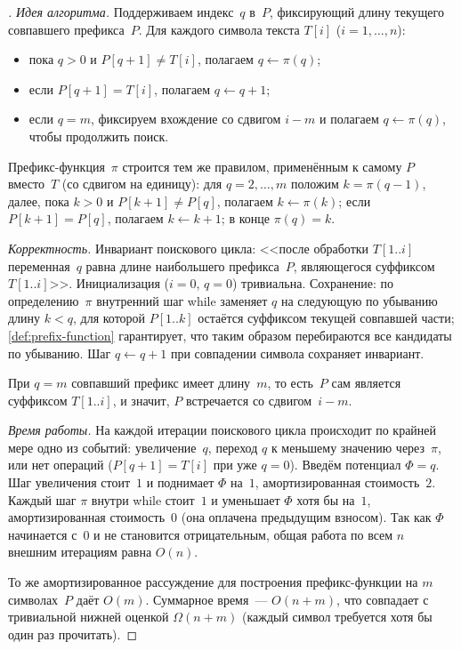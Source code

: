 \begin{proof}[]
\emph{Идея алгоритма.} Поддерживаем индекс~$q$ в~$P$, фиксирующий
длину текущего совпавшего префикса~$P$. Для каждого символа текста
$T[i]$ ($i = 1, \dots, n$):
\begin{itemize}
  \item пока $q > 0$ и $P[q + 1] \neq T[i]$, полагаем
        $q \leftarrow \pi(q)$;
  \item если $P[q + 1] = T[i]$, полагаем $q \leftarrow q + 1$;
  \item если $q = m$, фиксируем вхождение со сдвигом $i - m$ и
        полагаем $q \leftarrow \pi(q)$, чтобы продолжить поиск.
\end{itemize}
Префикс-функция~$\pi$ строится тем же правилом, применённым к самому
$P$ вместо~$T$ (со сдвигом на единицу): для $q = 2, \dots, m$ положим
$k = \pi(q - 1)$, далее, пока $k > 0$ и $P[k + 1] \neq P[q]$, полагаем
$k \leftarrow \pi(k)$; если $P[k + 1] = P[q]$, полагаем
$k \leftarrow k + 1$; в конце $\pi(q) = k$.

\emph{Корректность.} Инвариант поискового цикла: <<после обработки
$T[1..i]$ переменная~$q$ равна длине наибольшего префикса~$P$,
являющегося суффиксом $T[1..i]$>>. Инициализация ($i = 0$, $q = 0$)
тривиальна. Сохранение: по определению~$\pi$ внутренний шаг while
заменяет $q$ на следующую по убыванию длину $k < q$, для которой
$P[1..k]$ остаётся суффиксом текущей совпавшей части;
\cref{def:prefix-function} гарантирует, что таким образом
перебираются все кандидаты по убыванию. Шаг $q \leftarrow q + 1$ при
совпадении символа сохраняет инвариант.

При $q = m$ совпавший префикс имеет длину~$m$, то есть~$P$ сам
является суффиксом $T[1..i]$, и значит, $P$ встречается со
сдвигом~$i - m$.

\emph{Время работы.} На каждой итерации поискового цикла происходит
по крайней мере одно из событий: увеличение~$q$, переход $q$ к меньшему
значению через~$\pi$, или нет операций ($P[q + 1] = T[i]$ при уже
$q = 0$). Введём потенциал $\Phi = q$. Шаг увеличения стоит~$1$ и
поднимает $\Phi$ на~$1$, амортизированная стоимость~$2$. Каждый шаг
$\pi$ внутри while стоит~$1$ и уменьшает $\Phi$ хотя бы на~$1$,
амортизированная стоимость~$0$ (она оплачена предыдущим взносом). Так
как $\Phi$ начинается с~$0$ и не становится отрицательным, общая
работа по всем $n$ внешним итерациям равна $O(n)$.

То же амортизированное рассуждение для построения префикс-функции на
$m$ символах~$P$ даёт $O(m)$. Суммарное время~--- $O(n + m)$, что
совпадает с тривиальной нижней оценкой $\Omega(n + m)$ (каждый символ
требуется хотя бы один раз прочитать).
\end{proof}

